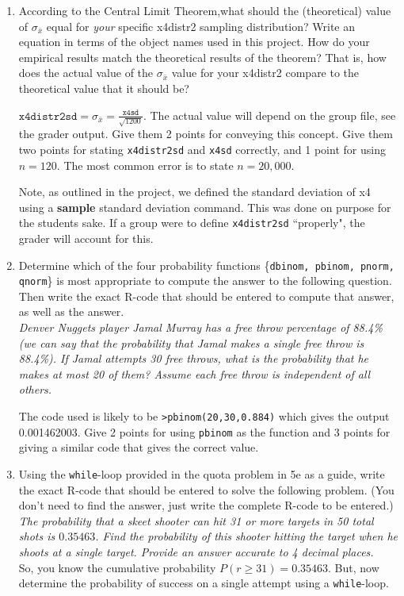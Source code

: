 \documentclass{article}
\newcommand{\answer}[1]{\color{red}#1}
\begin{document}
{{\begin{enumerate}
\newpage

\item According to the Central Limit Theorem,what should the (theoretical) value of $\sigma_{\bar{x}}$ equal for {\em your} specific x4distr2 sampling distribution? Write an equation in terms of the object names used in this project. How do your empirical results match the theoretical results of the theorem? That is, how does the actual value of the $\sigma_{\bar{x}}$ value for your x4distr2 compare to the theoretical value that it should be?

    {\answer $\texttt{x4distr2sd}=\sigma_{\bar{x}} = \frac{\texttt{x4sd}}{\sqrt{1200}}$. The actual value will depend on the group file, see the grader output. Give them 2 points for conveying this concept. Give them two points for stating \texttt{x4distr2sd} and \texttt{x4sd} correctly, and 1 point for using $n=120$. The most common error is to state $n=20,000$.
    
    Note, as outlined in the project, we defined the standard deviation of x4 using a \textbf{sample} standard deviation command. This was done on purpose for the students sake. If a group were to define \texttt{x4distr2sd} ``properly", the grader will account for this.}
    
\vfill

\item Determine which of the four probability functions \{\texttt{dbinom, pbinom, pnorm, qnorm}\} is most appropriate to compute the answer to the following question. Then write the exact R-code that should be entered to compute that answer, as well as the answer. \\
{\em Denver Nuggets player Jamal Murray has a free throw percentage of 88.4\% (we can say that the probability that Jamal makes a single free throw is 88.4\%). If Jamal attempts 30 free throws, what is the probability that he makes at most 20 of them? Assume each free throw is independent of all others.}

    {\answer The code used is likely to be \texttt{>pbinom(20,30,0.884)} which gives the output 0.001462003. Give 2 points for using \texttt{pbinom} as the function and 3 points for giving a similar code that gives the correct value. }
    
\vfill

\item Using the \texttt{while}-loop provided in the quota problem in 5e as a guide, write the exact R-code that should be entered to solve the following problem. (You don't need to find the answer, just write the complete R-code to be entered.) \\
{\em The probability that a skeet shooter can hit 31 or more targets in 50 total shots is $0.35463$. Find the probability of this shooter hitting the target when he shoots at a single target. Provide an answer accurate to 4 decimal places.}\\
So, you know the cumulative probability $P(r \geq 31) = 0.35463$. But, now determine the probability of success on a single attempt using a \texttt{while}-loop.


\end{enumerate}}}
\end{document}
